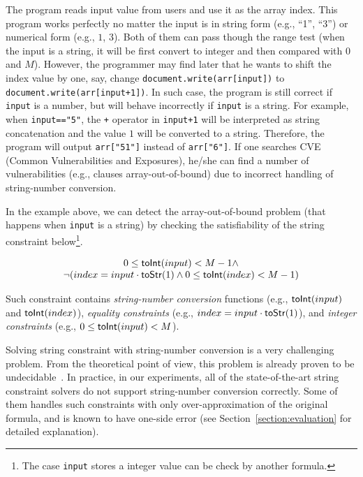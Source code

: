 \documentclass[sigplan,review,anonymous]{acmart}\settopmatter{printfolios=true,printccs=false,printacmref=false}
\begin{document}
{The program reads input value from users and use it as the array index. This program works perfectly no matter the input is in string form (e.g., ``1'', ``3'') or numerical form (e.g., $1$, $3$). Both of them can pass though the range test (when the input is a string, it will be first convert to integer and then compared with $0$ and $M$). However, the programmer may find later that he wants to shift the index value by one, say, change \texttt{document.write(arr[input])} to \texttt{document.write(arr[input+1])}. In such case, the program is still correct if \texttt{input} is a number, but will behave incorrectly if \texttt{input} is a string. For example, when \texttt{input=="5"}, the \texttt{+} operator in \texttt{input+1} will be interpreted as string concatenation and the value $1$ will be converted to a string. Therefore, the program will output \texttt{arr["51"]} instead of \texttt{arr["6"]}. If one searches CVE (Common Vulnerabilities and Exposures), he/she can find a number of vulnerabilities (e.g., clauses array-out-of-bound) due to incorrect handling of string-number conversion.

In the example above, we can detect the array-out-of-bound problem (that happens when \texttt{input} is a string) by checking the satisfiability of the string constraint below\footnote{The case \texttt{input} stores a integer value can be check by another formula.}. 

$$
\begin{array}{c}
0 \leq \mbox{\textsf{toInt}($input$)}<M-1 \wedge \\
\neg(index = input\cdot \mbox{\textsf{toStr}($1$)} \wedge 0 \leq \mbox{\textsf{toInt}($index$)} <M-1)
\end{array}
$$


Such constraint contains \textit{string-number conversion} functions (e.g., $\mbox{\textsf{toInt}($input$)}$ and $\mbox{\textsf{toInt}($index$)}$), \textit{equality constraints} (e.g., $index = input\cdot \mbox{\textsf{toStr}($1$)}$), and \textit{integer constraints} (e.g., $0 \leq \mbox{\textsf{toInt}($input$)}<M$). }

Solving string constraint with string-number conversion is a very challenging problem. From the theoretical point of view, this problem is already proven to be undecidable~\cite{day2018satisfiability}. In practice, in our experiments, all of the state-of-the-art string constraint solvers do not support string-number conversion correctly. Some of them handles such constraints with only over-approximation of the original formula, and is known to have one-side error (see Section~\ref{section:evaluation} for detailed explanation).  
\end{document}
